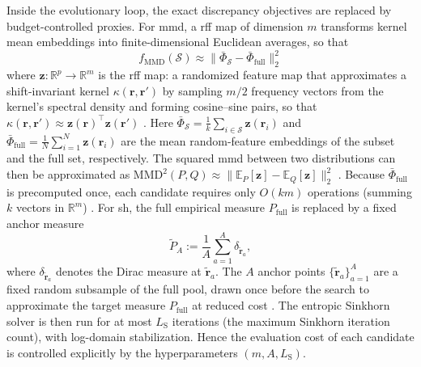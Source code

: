 \documentclass[10pt,journal]{IEEEtran}
\newcommand{\1}{\mathbf{1}}
\newcommand{\br}{\mathbf{r}}
\newcommand{\bz}{\mathbf{z}}
\newcommand{\Sel}{\mathcal{S}}
\newcommand{\Full}{\mathrm{full}}
\theoremstyle{ieeethm}
\begin{document}
Inside the evolutionary loop, the exact discrepancy objectives are replaced by budget-controlled proxies. For \gls{mmd}, a \gls{rff} map of dimension $m$ \cite{rahimi2007random} transforms kernel mean embeddings into finite-dimensional Euclidean averages, so that
\begin{equation*}
f_{\mathrm{MMD}}(\Sel)\approx \|\bar\Phi_{\Sel}-\bar\Phi_{\Full}\|_2^2
\end{equation*}
where $\bz:\mathbb{R}^p\to\mathbb{R}^m$ is the \gls{rff} map: a randomized feature map that approximates a shift-invariant kernel $\kappa(\br,\br')$ by sampling $m/2$ frequency vectors from the kernel's spectral density and forming cosine--sine pairs, so that $\kappa(\br,\br')\approx\bz(\br)^\top\bz(\br')$ \cite{rahimi2007random}. Here $\bar\Phi_{\Sel}=\frac{1}{k}\sum_{i\in\Sel}\bz(\br_i)$ and $\bar\Phi_{\Full}=\frac{1}{N}\sum_{i=1}^{N}\bz(\br_i)$ are the mean random-feature embeddings of the subset and the full set, respectively. The squared \gls{mmd} between two distributions can then be approximated as $\mathrm{MMD}^2(P,Q)\approx\|\mathbb{E}_P[\bz]-\mathbb{E}_Q[\bz]\|_2^2$ \cite{gretton2012kernel,rahimi2007random}. Because $\bar\Phi_{\Full}$ is precomputed once, each candidate requires only $O(km)$ operations (summing $k$ vectors in $\mathbb{R}^m$) \cite{rahimi2007random}. For \gls{sh}, the full empirical measure $P_{\Full}$ is replaced by a fixed anchor measure
\begin{equation*}
\widetilde P_A
:=
\frac{1}{A}\sum_{a=1}^{A}\delta_{\widetilde{\br}_a},
\end{equation*}
where $\delta_{\widetilde{\br}_a}$ denotes the Dirac measure 
at $\widetilde{\br}_a$. The $A$ anchor points $\{\widetilde{\br}_a\}_{a=1}^{A}$ are a fixed random subsample of the full pool, drawn once before the search to approximate the target measure $P_{\Full}$ at reduced cost \cite{cuturi2013sinkhorn}. The entropic Sinkhorn solver \cite{cuturi2013sinkhorn,feydy2019sinkhorn} is then run for at most $L_{\mathrm{S}}$ iterations (the maximum Sinkhorn iteration count), with log-domain stabilization. Hence the evaluation cost of each candidate is controlled explicitly by the hyperparameters $(m,A,L_{\mathrm{S}})$.
\end{document}
